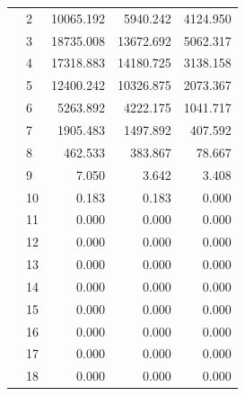\begin{tabular}{llrrr}
               & 2  &       10065.192 &        5940.242 &       4124.950 \\
               & 3  &       18735.008 &       13672.692 &       5062.317 \\
               & 4  &       17318.883 &       14180.725 &       3138.158 \\
               & 5  &       12400.242 &       10326.875 &       2073.367 \\
               & 6  &        5263.892 &        4222.175 &       1041.717 \\
               & 7  &        1905.483 &        1497.892 &        407.592 \\
               & 8  &         462.533 &         383.867 &         78.667 \\
               & 9  &           7.050 &           3.642 &          3.408 \\
               & 10 &           0.183 &           0.183 &          0.000 \\
               & 11 &           0.000 &           0.000 &          0.000 \\
               & 12 &           0.000 &           0.000 &          0.000 \\
               & 13 &           0.000 &           0.000 &          0.000 \\
               & 14 &           0.000 &           0.000 &          0.000 \\
               & 15 &           0.000 &           0.000 &          0.000 \\
               & 16 &           0.000 &           0.000 &          0.000 \\
               & 17 &           0.000 &           0.000 &          0.000 \\
               & 18 &           0.000 &           0.000 &          0.000 \\
\bottomrule
\end{tabular}


